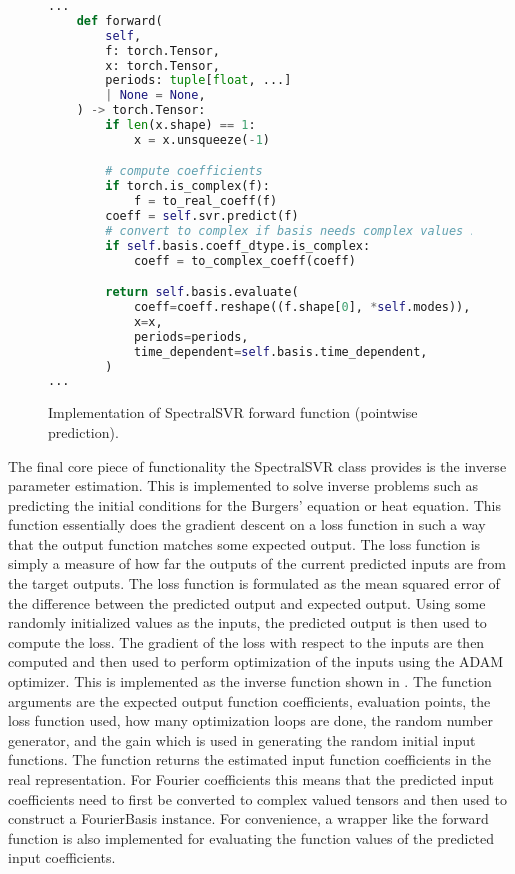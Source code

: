 \begin{figure}[H]
  \centering
  \begin{lstlisting}[language=Python]
...
    def forward(
        self,
        f: torch.Tensor,
        x: torch.Tensor,
        periods: tuple[float, ...]
        | None = None,
    ) -> torch.Tensor:
        if len(x.shape) == 1:
            x = x.unsqueeze(-1)

        # compute coefficients
        if torch.is_complex(f):
            f = to_real_coeff(f)
        coeff = self.svr.predict(f)
        # convert to complex if basis needs complex values so that the reshaping is correct
        if self.basis.coeff_dtype.is_complex:
            coeff = to_complex_coeff(coeff)

        return self.basis.evaluate(
            coeff=coeff.reshape((f.shape[0], *self.modes)),
            x=x,
            periods=periods,
            time_dependent=self.basis.time_dependent,
        )
...
  \end{lstlisting}
  \caption{Implementation of SpectralSVR forward function (pointwise prediction).}\label{fig:spectralsvr_forward_impl}
\end{figure}

The final core piece of functionality the SpectralSVR class provides is the inverse parameter estimation. This is implemented to solve inverse problems such as predicting the initial conditions for the Burgers' equation or heat equation. This function essentially does the gradient descent on a loss function in such a way that the output function matches some expected output. The loss function is simply a measure of how far the outputs of the current predicted inputs are from the target outputs. The loss function is formulated as the mean squared error of the difference between the predicted output and expected output. Using some randomly initialized values as the inputs, the predicted output is then used to compute the loss. The gradient of the loss with respect to the inputs are then computed and then used to perform optimization of the inputs using the ADAM optimizer. This is implemented as the inverse function shown in . The function arguments are the expected output function coefficients, evaluation points, the loss function used, how many optimization loops are done, the random number generator, and the gain which is used in generating the random initial input functions. The function returns the estimated input function coefficients in the real representation. For Fourier coefficients this means that the predicted input coefficients need to first be converted to complex valued tensors and then used to construct a FourierBasis instance. For convenience, a wrapper like the forward function is also implemented for evaluating the function values of the predicted input coefficients.

